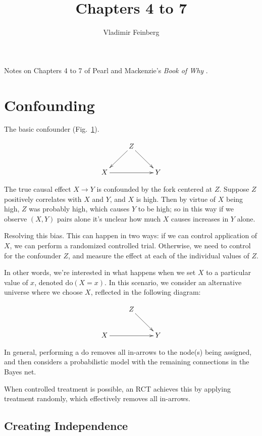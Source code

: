 \documentclass{article}
\title{Chapters 4 to 7}
\author{Vladimir Feinberg}
\begin{document}
\maketitle

Notes on Chapters 4 to 7 of Pearl and Mackenzie's \textit{Book of Why} \cite{pearl2018book}.

\setcounter{section}{3}

\section{Confounding}

The basic confounder (Fig.~\ref{fig:fig41}).

\begin{figure}[h]
  \centering
  $$\xymatrix{
    &Z \ar[dl]\ar[dr]&\\
    X \ar[rr]& & Y
}
$$
  \caption{\label{fig:fig41} }
\end{figure}

The true causal effect $X\rightarrow Y$ is confounded by the fork centered at $Z$. Suppose $Z$ positively correlates with $X$ and $Y$, and $X$ is high. Then by virtue of $X$ being high, $Z$ was probably high, which causes $Y$ to be high; so in this way if we observe $(X, Y)$ pairs alone it's unclear how much $X$ causes increases in $Y$ alone.

Resolving this bias. This can happen in two ways: if we can control application of $X$, we can perform a randomized controlled trial. Otherwise, we need to control for the confounder $Z$, and measure the effect at each of the individual values of $Z$.

In other words, we're interested in what happens when we set $X$ to a particular value of $x$, denoted $\mathrm{do}(X=x)$. In this scenario, we consider an alternative universe where we choose $X$, reflected in the following diagram:

$$
\xymatrix{
    &Z \ar[dr]&\\
    X \ar[rr]& & Y
}
$$

In general, performing a $\mathrm{do}$ removes all in-arrows to the node(s) being assigned, and then considers a probabilistic model with the remaining connections in the Bayes net.

When controlled treatment is possible, an RCT achieves this by applying treatment randomly, which effectively removes all in-arrows.

\subsection{Creating Independence}
\end{document}
